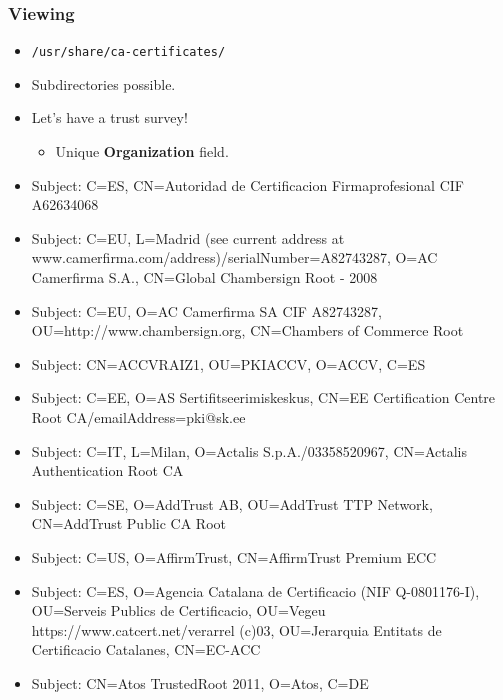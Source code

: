 \documentclass[xcolor={dvipsnames,svgnames},hyperref=dvips]{beamer}
\begin{document}
	\begin{frame}
		\frametitle{Viewing}
		\begin{itemize}
		\item \texttt{/usr/share/ca-certificates/}
		\item Subdirectories possible.
		\item Let's have a trust survey!
			\begin{itemize}
			\item Unique \textbf{Organization} field.
			\end{itemize}
		\end{itemize}
	\end{frame}

	\begin{frame}
		\begin{itemize}
		\item Subject: C=ES, CN=Autoridad de Certificacion Firmaprofesional CIF A62634068
		\item Subject: C=EU, L=Madrid (see current address at www.camerfirma.com/address)/serialNumber=A82743287, O=AC Camerfirma S.A., CN=Global Chambersign Root - 2008
		\item Subject: C=EU, O=AC Camerfirma SA CIF A82743287, OU=http://www.chambersign.org, CN=Chambers of Commerce Root
		\item Subject: CN=ACCVRAIZ1, OU=PKIACCV, O=ACCV, C=ES
		\item Subject: C=EE, O=AS Sertifitseerimiskeskus, CN=EE Certification Centre Root CA/emailAddress=pki@sk.ee
		\end{itemize}
	\end{frame}
	\begin{frame}
		\begin{itemize}
		\item Subject: C=IT, L=Milan, O=Actalis S.p.A./03358520967, CN=Actalis Authentication Root CA
		\item Subject: C=SE, O=AddTrust AB, OU=AddTrust TTP Network, CN=AddTrust Public CA Root
		\item Subject: C=US, O=AffirmTrust, CN=AffirmTrust Premium ECC
		\item Subject: C=ES, O=Agencia Catalana de Certificacio (NIF Q-0801176-I), OU=Serveis Publics de Certificacio, OU=Vegeu https://www.catcert.net/verarrel (c)03, OU=Jerarquia Entitats de Certificacio Catalanes, CN=EC-ACC
		\item Subject: CN=Atos TrustedRoot 2011, O=Atos, C=DE
		\end{itemize}
	\end{frame}
\end{document}
